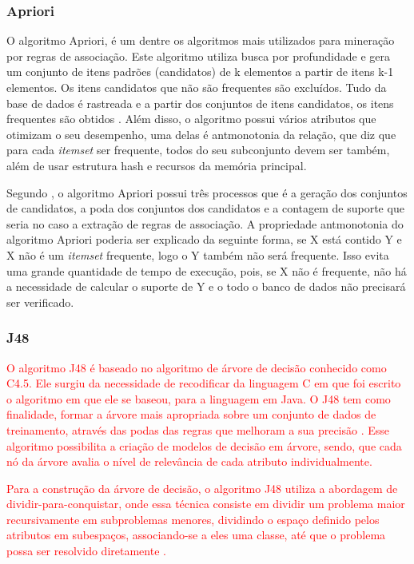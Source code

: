 \subsubsection{Apriori}

\par
O algoritmo Apriori, é um dentre os algoritmos mais utilizados para mineração por regras de associação. Este algoritmo utiliza busca por profundidade e gera um conjunto de itens padrões (candidatos) de k elementos a partir de itens k-1 elementos. Os itens candidatos que não são frequentes são excluídos. Tudo da base de dados é rastreada e a partir dos conjuntos de itens candidatos, os itens frequentes são obtidos \cite{Vasconcelos2004}. Além disso, o algoritmo possui vários atributos que otimizam o seu desempenho, uma delas é antmonotonia da relação, que diz que para cada \textit{itemset} ser frequente, todos do seu subconjunto devem ser também, além de usar estrutura hash e recursos da memória principal.

\par
Segundo , o algoritmo Apriori possui três processos que é a geração dos conjuntos de candidatos, a poda dos conjuntos dos candidatos e a contagem de suporte que seria no caso a extração de regras de associação. A propriedade antmonotonia do algoritmo Apriori poderia ser explicado da seguinte forma, se X está contido Y e X não é um \textit{itemset} frequente, logo o Y também não será frequente. Isso evita uma grande quantidade de tempo de execução, pois, se X não é frequente, não há a necessidade de calcular o suporte de Y e o todo o banco de dados não precisará ser verificado.


\subsubsection{J48}

\textcolor{red}{O algoritmo J48 é baseado no algoritmo de árvore de decisão conhecido como C4.5. Ele surgiu da necessidade de recodificar da linguagem C em que foi escrito o algoritmo em que ele se baseou, para a linguagem em Java. O J48 tem como finalidade, formar a árvore mais apropriada sobre um conjunto de dados de treinamento, através das podas das regras que melhoram a sua precisão \cite{Marques2014, Librelotto2014}. Esse algoritmo possibilita a criação de modelos de decisão em árvore, sendo, que cada nó da árvore avalia o nível de relevância de cada atributo individualmente.}

\par
\textcolor{red}{Para a construção da árvore de decisão, o algoritmo J48 utiliza a abordagem de dividir-para-conquistar, onde essa técnica consiste em dividir um problema maior recursivamente em subproblemas menores, dividindo o espaço definido pelos atributos em subespaços, associando-se a eles uma classe, até que o problema possa ser resolvido diretamente \cite{Librelotto2014}.}


